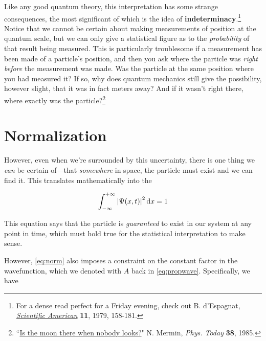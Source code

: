 Like any good quantum theory, this interpretation has some strange consequences, the most significant of which is the idea of \textbf{indeterminacy}.\footnote{For a dense read perfect for a Friday evening, check out B. d'Espagnat, \href{https://drive.google.com/file/d/1guIxArt4_G_G9hkvI5QCiWPoJC79YBmm/view?usp=sharing}{\emph{Scientific American}} \textbf{11}, 1979, 158-181.} 
Notice that we cannot be certain about making measurements of position at the quantum scale, but we can only give a statistical figure as to the \emph{probability} of that result being measured. 
This is particularly troublesome if a measurement has been made of a particle's position, and then you ask where the particle was \emph{right before} the measurement was made. 
Was the particle at the same position where you had measured it? 
If so, why does quantum mechanics still give the possibility, however slight, that it was in fact meters away? 
And if it wasn't right there, where exactly was the particle?\footnote{``\href{http://physicstoday.scitation.org/doi/abs/10.1063/1.880968}{Is the moon there when nobody looks?}" N. Mermin, \emph{Phys. Today} \textbf{38}, 1985.}


\section{Normalization} \label{sec:normse}

However, even when we're surrounded by this uncertainty, there is one thing we \emph{can} be certain of---that \emph{somewhere} in space, the particle must exist and we can find it. 
This translates mathematically into the

\begin{tcolorbox}[title=Normalization condition] \vspace{-1ex}
	\begin{equation}
	\int_{-\infty}^{+\infty} \abs{\Psi(x,t)}^2 \dd{x} = 1 \label{eq:norm}
	\end{equation}
\end{tcolorbox}

This equation says that the particle is \emph{guaranteed} to exist in our system at any point in time, which must hold true for the statistical interpretation to make sense. 

However, \autoref{eq:norm} also imposes a constraint on the constant factor in the wavefunction, which we denoted with $A$ back in \autoref{eq:propwave}. 
Specifically, we have

